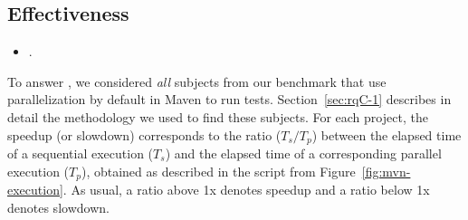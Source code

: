 

\subsection{Effectiveness}
\label{sec:rqD}

\begin{itemize}
    \item \numRQD{}. \textbf{\RQD}
\end{itemize}

To answer \numRQD{}, we considered \emph{all} \numProjectsPar{}
subjects from our benchmark that use parallelization by default in
Maven to run tests.  Section~\ref{sec:rqC-1} describes in detail the
methodology we used to find these subjects. For each project, the
speedup (or slowdown) corresponds to the ratio ($T_s/T_p$) between the
elapsed time of a sequential execution ($T_s$) and the elapsed time of
a corresponding parallel execution ($T_p$), obtained as described in
the script from Figure~\ref{fig:mvn-execution}.  As usual, a ratio
above 1x denotes speedup and a ratio below 1x denotes slowdown.


